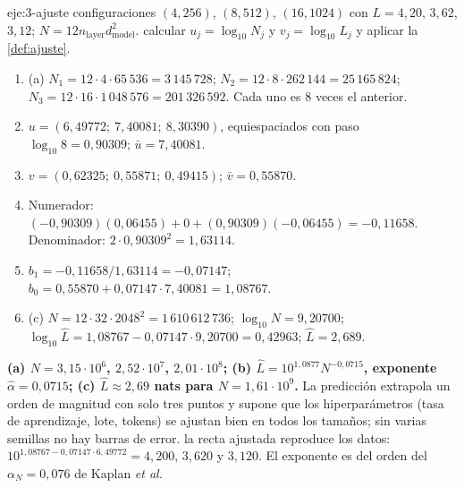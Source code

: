 \begin{solucion}{eje:3-ajuste}
\datos configuraciones $(4,256)$, $(8,512)$, $(16,1024)$ con $L=4{,}20$, $3{,}62$, $3{,}12$; $N=12n_{\mathrm{layer}}d_{\mathrm{model}}^{2}$.
\planteamiento calcular $u_j=\log_{10}N_j$ y $v_j=\log_{10}L_j$ y aplicar la \cref{def:ajuste}.
\pasos
\begin{enumerate}[label=\arabic*.]
  \item (a) $N_1=12\cdot 4\cdot 65\,536=3\,145\,728$; $N_2=12\cdot 8\cdot 262\,144=25\,165\,824$; $N_3=12\cdot 16\cdot 1\,048\,576=201\,326\,592$. Cada uno es $8$ veces el anterior.
  \item $u=(6{,}49772;\ 7{,}40081;\ 8{,}30390)$, equiespaciados con paso $\log_{10}8=0{,}90309$; $\bar u=7{,}40081$.
  \item $v=(0{,}62325;\ 0{,}55871;\ 0{,}49415)$; $\bar v=0{,}55870$.
  \item Numerador: $(-0{,}90309)(0{,}06455)+0+(0{,}90309)(-0{,}06455)=-0{,}11658$. Denominador: $2\cdot 0{,}90309^{2}=1{,}63114$.
  \item $b_1=-0{,}11658/1{,}63114=-0{,}07147$; $b_0=0{,}55870+0{,}07147\cdot 7{,}40081=1{,}08767$.
  \item (c) $N=12\cdot 32\cdot 2048^{2}=1\,610\,612\,736$; $\log_{10}N=9{,}20700$; $\log_{10}\hat L=1{,}08767-0{,}07147\cdot 9{,}20700=0{,}42963$; $\hat L=2{,}689$.
\end{enumerate}
\resultado \textbf{(a) $N=3{,}15\cdot 10^{6}$, $2{,}52\cdot 10^{7}$, $2{,}01\cdot 10^{8}$; (b) $\hat L=10^{1{,}0877}N^{-0{,}0715}$, exponente $\hat\alpha=0{,}0715$; (c) $\hat L\approx 2{,}69$ nats para $N=1{,}61\cdot 10^{9}$.} La predicción extrapola un orden de magnitud con solo tres puntos y supone que los hiperparámetros (tasa de aprendizaje, lote, tokens) se ajustan bien en todos los tamaños; sin varias semillas no hay barras de error.
\comprobacion la recta ajustada reproduce los datos: $10^{1{,}08767-0{,}07147\cdot 6{,}49772}=4{,}200$, $3{,}620$ y $3{,}120$. El exponente es del orden del $\alpha_N=0{,}076$ de Kaplan \emph{et al.}
\end{solucion}

